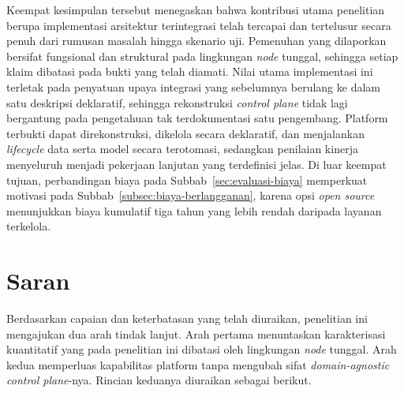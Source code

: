 Keempat kesimpulan tersebut menegaskan bahwa kontribusi utama penelitian berupa implementasi arsitektur terintegrasi telah tercapai dan tertelusur secara penuh dari rumusan masalah hingga skenario uji. Pemenuhan yang dilaporkan bersifat fungsional dan struktural pada lingkungan \textit{node} tunggal, sehingga setiap klaim dibatasi pada bukti yang telah diamati. Nilai utama implementasi ini terletak pada penyatuan upaya integrasi yang sebelumnya berulang ke dalam satu deskripsi deklaratif, sehingga rekonstruksi \textit{control plane} tidak lagi bergantung pada pengetahuan tak terdokumentasi satu pengembang. Platform terbukti dapat direkonstruksi, dikelola secara deklaratif, dan menjalankan \textit{lifecycle} data serta model secara terotomasi, sedangkan penilaian kinerja menyeluruh menjadi pekerjaan lanjutan yang terdefinisi jelas. Di luar keempat tujuan, perbandingan biaya pada Subbab~\ref{sec:evaluasi-biaya} memperkuat motivasi pada Subbab~\ref{subsec:biaya-berlangganan}, karena opsi \textit{open source} menunjukkan biaya kumulatif tiga tahun yang lebih rendah daripada layanan terkelola.

\section{Saran}
\label{sec:saran}

Berdasarkan capaian dan keterbatasan yang telah diuraikan, penelitian ini mengajukan dua arah tindak lanjut. Arah pertama menuntaskan karakterisasi kuantitatif yang pada penelitian ini dibatasi oleh lingkungan \textit{node} tunggal. Arah kedua memperluas kapabilitas platform tanpa mengubah sifat \textit{domain-agnostic} \textit{control plane}-nya. Rincian keduanya diuraikan sebagai berikut.


